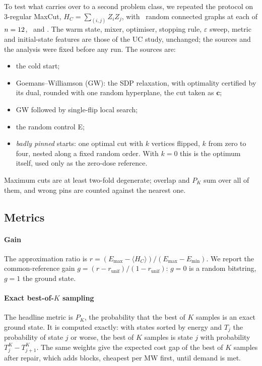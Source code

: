 To test what carries over to a second problem class, we repeated the protocol on 3-regular MaxCut, $H_C=\sum_{(i,j)}Z_iZ_j$, with \MCGraphs\ random connected graphs at each of $n=12$, \MCSizeSixteen\ and \MCSizeTwenty. The warm state, mixer, optimiser, stopping rule, $\varepsilon$ sweep, metric and initial-state features are those of the UC study, unchanged; the sources and the analysis were fixed before any run. The sources are:
\begin{itemize}
\item the cold start;
\item Goemans--Williamson (GW): the SDP relaxation, with optimality certified by its dual, rounded with one random hyperplane, the cut taken as $\mathbf c$;
\item GW followed by single-flip local search;
\item the random control E;
\item \emph{badly pinned} starts: one optimal cut with $k$ vertices flipped, $k$ from zero to four, nested along a fixed random order. With $k=0$ this is the optimum itself, used only as the zero-dose reference.
\end{itemize}
Maximum cuts are at least two-fold degenerate; overlap and $P_K$ sum over all of them, and wrong pins are counted against the nearest one.

\subsection{Metrics}
\label{sec:metrics}

\paragraph{Gain} The approximation ratio is $r=(E_{\max}-\langle H_C\rangle)/(E_{\max}-E_{\min})$. We report the common-reference gain $g=(r-r_{\mathrm{unif}})/(1-r_{\mathrm{unif}})$: $g=0$ is a random bitstring, $g=1$ the ground state.

\paragraph{Exact best-of-$K$ sampling} The headline metric is $P_K$, the probability that the best of $K$ samples is an exact ground state. It is computed exactly: with states sorted by energy and $T_j$ the probability of state $j$ or worse, the best of $K$ samples is state $j$ with probability $T_j^K-T_{j+1}^K$. The same weights give the expected cost gap of the best of $K$ samples after repair, which adds blocks, cheapest per MW first, until demand is met.

